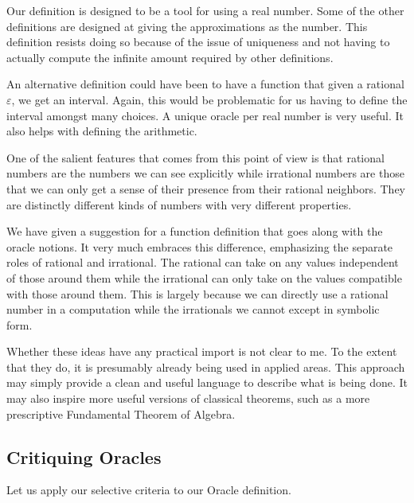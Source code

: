 \documentclass[12pt]{article}
\theoremstyle{remark}
\begin{document}
Our definition is designed to be a tool for using a real number. Some of the other definitions are designed at giving the approximations as the number. This definition resists doing so because of the issue of uniqueness and not having to actually compute the infinite amount required by other definitions. 

An alternative definition could have been to have a function that given a rational $\varepsilon$, we get an interval. Again, this would be problematic for us having to define the interval amongst many choices. A unique oracle per real number is very useful. It also helps with defining the arithmetic. 

One of the salient features that comes from this point of view is that rational numbers are the numbers we can see explicitly while irrational numbers are those that we can only get a sense of their presence from their rational neighbors. They are distinctly different kinds of numbers with very different properties. 

We have given a suggestion for a function definition that goes along with the oracle notions. It very much embraces this difference, emphasizing the separate roles of rational and irrational. The rational can take on any values independent of those around them while the irrational can only take on the values compatible with those around them. This is largely because we can directly use a rational number in a computation while the irrationals we cannot except in symbolic form. 

Whether these ideas have any practical import is not clear to me. To the extent that they do, it is presumably already being used in applied areas. This approach may simply provide a clean and useful language to describe what is being done. It may also inspire more useful versions of classical theorems, such as a more prescriptive Fundamental Theorem of Algebra. 

\subsection{Critiquing Oracles}

Let us apply our selective criteria to our Oracle definition. 
\end{document}
